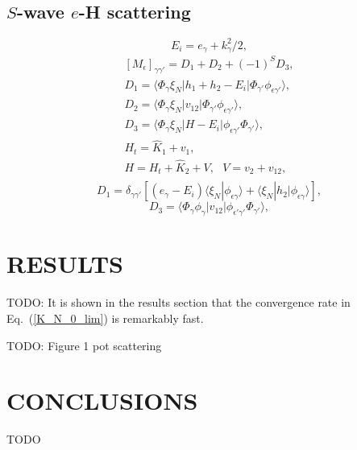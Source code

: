 \documentclass[aip
, pra
, showpacs
, aps
, twocolumn
, groupedaddress
, floatfix
]{revtex4}
\newcommand{\beq}{\begin{equation}}
\newcommand{\eeq}{\end{equation}}
\newcommand{\barr}{\begin{array}}
\newcommand{\earr}{\end{array}}
\begin{document}
\subsection{$S$-wave $e$-H scattering}
\beq
E_i = e_\gamma + k^2_\gamma/2,
\eeq
\beq \barr{l}
[M_{\epsilon}]_{\gamma \gamma'} = D_1 + D_2 + (-1)^S D_3,\\
D_1 = \langle \Phi_\gamma \xi_{N}  | h_1 + h_2-E_i |
\Phi_{\gamma'} \phi_{\epsilon \gamma'} \rangle, \\
D_2 = \langle \Phi_\gamma \xi_{N}  | v_{12} |
\Phi_{\gamma'} \phi_{\epsilon \gamma'} \rangle, \\
D_3 = \langle \Phi_\gamma \xi_{N}  | H -E_i |
\phi_{\epsilon \gamma'} \Phi_{\gamma'}  \rangle, \\
H_t = \hat{K}_1 + v_1, \\
H = H_t + \hat{K}_2 + V, \ \ \ V = v_2 + v_{12},\\
\earr \label{Y_B_W} \eeq
\beq
D_1 = \delta_{\gamma \gamma'} [ (e_\gamma -  E_i)
\langle \xi_N | \phi_{\epsilon \gamma} \rangle + \langle \xi_N | h_2|\phi_{\epsilon \gamma} \rangle],
\eeq
\beq
D_3 =  \langle \Phi_\gamma \phi_{\gamma}  | v_{12}|
\phi_{\epsilon' \gamma'} \Phi_{\gamma'}  \rangle ,
\label{eH_ex} \eeq







\section{RESULTS}
TODO: It is shown in the results section that the convergence rate in Eq.~(\ref{K_N_0_lim}) is remarkably fast.

TODO: Figure 1 pot scattering

\section{CONCLUSIONS}
TODO


\begin{acknowledgments}
\end{acknowledgments}





%
\end{document}
